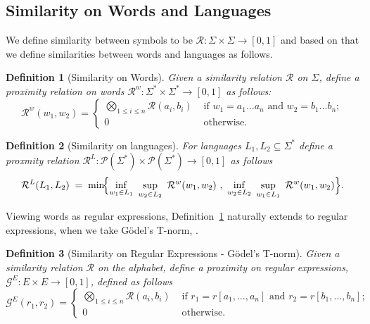 \documentclass{article}
\newtheorem{definition}{Definition}[section]
\begin{document}
\subsection{Similarity on Words and Languages}
We define similarity between symbols to be $\mathcal{R}:\Sigma \times \Sigma \rightarrow [0,1]$ and based on that we  define similarities between words and languages as follows.
\begin{definition}[Similarity on Words]\label{def:Rw}Given a similarity relation $\mathcal R$ on $\Sigma$, define a proximity relation on  words $\mathcal{R}^w:\Sigma^* \times \Sigma^* \rightarrow [0,1]$ as follows:$$\mathcal R^{w}(w_1,w_2) =\begin{cases}\bigotimes_{1\leq i\leq n}\mathcal R(a_i,b_i) &\mbox{ if } w_1=a_1\ldots a_n\mbox{ and }w_2 =b_1 \ldots b_n;
\\ 
0& \mbox{  otherwise. }
\end{cases}$$
\end{definition}
\begin{definition}[Similarity on languages]\label{def:RL}
For languages $L_1,L_2\subseteq \Sigma^*$ define a proxmity relation $\mathcal{R}^L:\mathcal P(\Sigma^\ast)\times \mathcal P(\Sigma^\ast)\to [0,1]$ as follows
\[
\mathcal{R}^L(L_1,L_2)\;=\;
\min\!\Bigl\{
\inf_{w_1\in L_1}\ \sup_{w_2\in L_2}\ \mathcal{R}^w(w_1,w_2)\ ,\
\inf_{w_2\in L_2}\ \sup_{w_1\in L_1}\ \mathcal{R}^w(w_1,w_2)
\Bigr\}.
\]
\end{definition}

Viewing words as regular expressions,  Definition~\ref{def:Rw} naturally extends to regular expressions, when we take G\"odel's T-norm, .
\begin{definition}[Similarity on Regular Expressions - G\"odel's T-norm] \label{def:Rexp}Given a similarity relation $\mathcal R$ on the alphabet, define a proximity on regular expressions,  $\mathcal{G}^{E}:E \times E \rightarrow [0,1]$, defined as follows
$$\mathcal G^{E}(r_1,r_2) =\begin{cases}\bigotimes_{1\leq i\leq n}\mathcal R(a_i,b_i) &\mbox{ if } r_1=r[a_1,\ldots,a_n]\mbox{ and }r_2 =r[b_1,\ldots,b_n];
\\ 
0& \mbox{  otherwise. }
\end{cases}$$
\end{definition}

\end{document}
